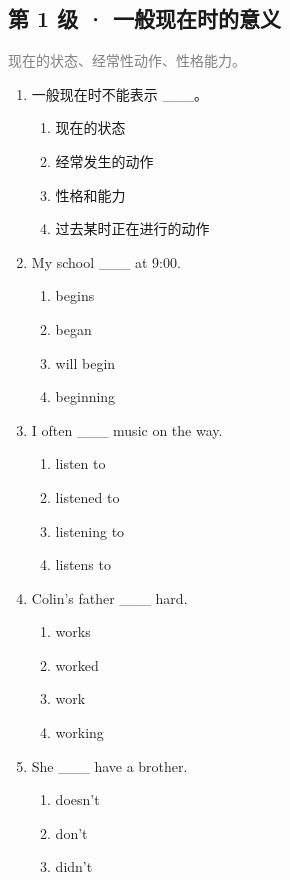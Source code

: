 \documentclass[11pt,a4paper]{ctexart}
\begin{document}
\subsection*{第 1 级 · 一般现在时的意义}
\noindent\textcolor{gray}{现在的状态、经常性动作、性格能力。}\par\smallskip
\begin{enumerate}[leftmargin=*,itemsep=4pt]
\item 一般现在时不能表示 \_\_\_。
\begin{enumerate}[label=\Alph*.,leftmargin=2em,itemsep=1pt,topsep=2pt]
\item 现在的状态
\item 经常发生的动作
\item 性格和能力
\item 过去某时正在进行的动作
\end{enumerate}
\item My school \_\_\_ at 9:00.
\begin{enumerate}[label=\Alph*.,leftmargin=2em,itemsep=1pt,topsep=2pt]
\item begins
\item began
\item will begin
\item beginning
\end{enumerate}
\item I often \_\_\_ music on the way.
\begin{enumerate}[label=\Alph*.,leftmargin=2em,itemsep=1pt,topsep=2pt]
\item listen to
\item listened to
\item listening to
\item listens to
\end{enumerate}
\item Colin’s father \_\_\_ hard.
\begin{enumerate}[label=\Alph*.,leftmargin=2em,itemsep=1pt,topsep=2pt]
\item works
\item worked
\item work
\item working
\end{enumerate}
\item She \_\_\_ have a brother.
\begin{enumerate}[label=\Alph*.,leftmargin=2em,itemsep=1pt,topsep=2pt]
\item doesn’t
\item don’t
\item didn’t

\end{enumerate}
\end{enumerate}
\end{document}
